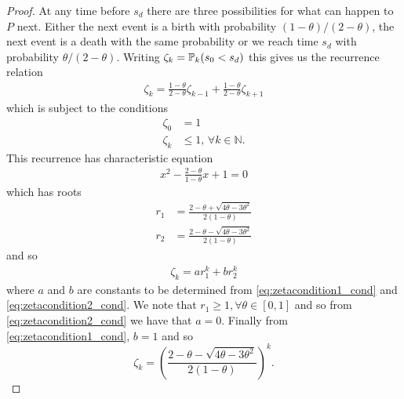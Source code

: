 \begin{proof}
		 At any time before $s_d$ there are three possibilities for what can happen to $P$ next. Either the next event is a birth with probability $(1 - \theta)/(2 - \theta)$, the next event is a death with the same probability or we reach time $s_d$ with probability $\theta/(2 - \theta)$. Writing $\zeta_k = \mathbb{P}_k(s_0 < s_d)$ this gives us the recurrence relation
		 \begin{align}
		 	\zeta_k = \frac{1 - \theta}{2 - \theta} \zeta_{k-1} + \frac{1 - \theta}{2 - \theta} \zeta_{k+1}
		 \end{align}
		 which is subject to the conditions 
		 \begin{align}
		 	\label{eq:zetacondition1_cond}
		 	\zeta_0 &= 1\\
		 	\zeta_k &\leq 1, \, \forall k \in \mathbb{N}.
		 	\label{eq:zetacondition2_cond}
		 \end{align} 
		 This recurrence has characteristic equation
		 \begin{align}
		 	x^2 - \frac{2 - \theta}{1 - \theta} x + 1 = 0
		 \end{align}
		 which has roots
		 \begin{align}
		 	r_1 &= \frac{2 - \theta + \sqrt{4\theta - 3\theta^2}}{2(1 - \theta)}\\
		 	r_2 &= \frac{2 - \theta - \sqrt{4\theta - 3\theta^2}}{2(1 - \theta)}
		 \end{align}
		 and so
		 \begin{align}
		 	\zeta_k = a r_1^k + b r_2^k
		 \end{align}
		 where $a$ and $b$ are constants to be determined from \eqref{eq:zetacondition1_cond} and \eqref{eq:zetacondition2_cond}. We note that $r_1 \geq 1, \forall \theta \in [0,1]$ and so from \eqref{eq:zetacondition2_cond} we have that $a = 0$. Finally from \eqref{eq:zetacondition1_cond}, $b = 1$ and so
		 \begin{equation}
		 	\zeta_k = \left(\frac{2 - \theta - \sqrt{4\theta - 3\theta^2}}{2(1 - \theta)}\right)^k.
		 \end{equation}
	\end{proof}

